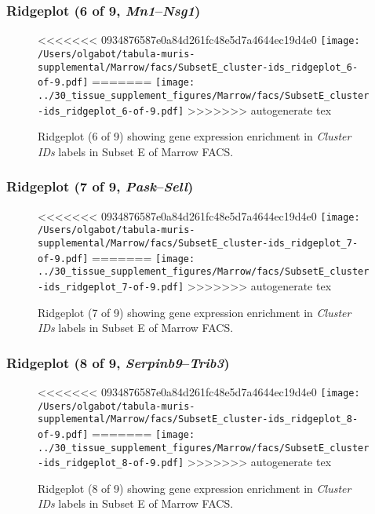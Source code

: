 \clearpage

\subsubsection{Ridgeplot (6 of 9, \emph{Mn1}--\emph{Nsg1})}
\begin{figure}[h]
\centering
<<<<<<< 0934876587e0a84d261fc48e5d7a4644ec19d4e0
\texttt{[image: /Users/olgabot/tabula-muris-supplemental/Marrow/facs/SubsetE\_cluster-ids\_ridgeplot\_6-of-9.pdf]}
=======
\texttt{[image: ../30\_tissue\_supplement\_figures/Marrow/facs/SubsetE\_cluster-ids\_ridgeplot\_6-of-9.pdf]}
>>>>>>> autogenerate tex

\caption{ Ridgeplot (6 of 9)  showing gene expression enrichment in \emph{Cluster IDs} labels in Subset E of Marrow FACS. }
\end{figure}


\clearpage

\subsubsection{Ridgeplot (7 of 9, \emph{Pask}--\emph{Sell})}
\begin{figure}[h]
\centering
<<<<<<< 0934876587e0a84d261fc48e5d7a4644ec19d4e0
\texttt{[image: /Users/olgabot/tabula-muris-supplemental/Marrow/facs/SubsetE\_cluster-ids\_ridgeplot\_7-of-9.pdf]}
=======
\texttt{[image: ../30\_tissue\_supplement\_figures/Marrow/facs/SubsetE\_cluster-ids\_ridgeplot\_7-of-9.pdf]}
>>>>>>> autogenerate tex

\caption{ Ridgeplot (7 of 9)  showing gene expression enrichment in \emph{Cluster IDs} labels in Subset E of Marrow FACS. }
\end{figure}


\clearpage

\subsubsection{Ridgeplot (8 of 9, \emph{Serpinb9}--\emph{Trib3})}
\begin{figure}[h]
\centering
<<<<<<< 0934876587e0a84d261fc48e5d7a4644ec19d4e0
\texttt{[image: /Users/olgabot/tabula-muris-supplemental/Marrow/facs/SubsetE\_cluster-ids\_ridgeplot\_8-of-9.pdf]}
=======
\texttt{[image: ../30\_tissue\_supplement\_figures/Marrow/facs/SubsetE\_cluster-ids\_ridgeplot\_8-of-9.pdf]}
>>>>>>> autogenerate tex

\caption{ Ridgeplot (8 of 9)  showing gene expression enrichment in \emph{Cluster IDs} labels in Subset E of Marrow FACS. }
\end{figure}


